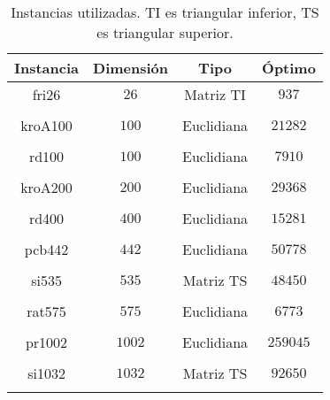 \begin{table}[H]
	\centering
	\begin{tabular}{cccc}
		\toprule
		Instancia & Dimensión & Tipo & Óptimo\\
		\midrule
		fri26 &$26$ & Matriz TI &$ 937$\\\\
		\midrule
		kroA100 &$100$ & Euclidiana &$21282$\\\\

		\midrule
		rd100 &$100$ & Euclidiana  &$7910$\\\\
		\midrule
		kroA200 &$200$ & Euclidiana &$29368$\\\\
		\midrule
		rd400 &$400$ & Euclidiana  &$15281$\\\\
		\midrule
		pcb442 &$442$ & Euclidiana &$50778$\\\\
		\midrule
		si535& $535$ & Matriz TS  &$48450$\\\\
		\midrule
		rat575 &$575$ & Euclidiana &$6773$\\\\
		\midrule
		pr1002 &$1002$ & Euclidiana &$259045$\\\\
		\midrule
		si1032 &$1032$ & Matriz TS &$92650$\\\\
		\bottomrule
	\end{tabular}
	\caption{Instancias utilizadas. TI es triangular inferior, TS es triangular superior.}
	\label{instances}

	\end{table}
